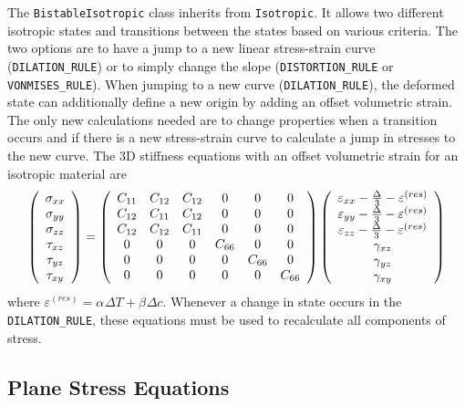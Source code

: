 \documentclass[11pt]{article}
\def\a#1{\alpha_{#1}}
\def\b#1{\beta_{#1}}
\def\code#1{{\small\tt #1}}
\def\DT{\Delta T}
\def\e#1{\varepsilon_{#1}}
\def\er#1{\varepsilon_{#1}^{(res)}}
\def\g#1{\gamma_{#1}}
\def\s#1{\sigma_{#1}}
\def\t#1{\tau_{#1}}
\begin{document}
The \code{BistableIsotropic} class inherits from \code{Isotropic}. It allows two different isotropic states and transitions  between the states based on various criteria. The two options are to have a jump to a new linear stress-strain curve (\code{DILATION\_RULE}) or to simply change the slope (\code{DISTORTION\_RULE} or \code{VONMISES\_RULE}). When jumping to a new curve (\code{DILATION\_RULE}), the deformed state can additionally define a new origin by adding an offset volumetric strain. The only new calculations needed are to change properties when a transition occurs and if there is a new stress-strain curve to calculate a jump in stresses to the new curve. The 3D stiffness equations with an offset volumetric strain for an isotropic material are
\begin{equation}
     \left(\begin{array}{c} \s{xx} \\ \s{yy} \\ \s{zz} \\ \t{xz} \\ \t{yz} \\ \t{xy} \end{array}\right)
       =  \left(\begin{array}{cccccc}
      C_{11} & C_{12} & C_{12} & 0 & 0 & 0 \\
      C_{12} & C_{11} & C_{12} & 0 & 0 & 0 \\
      C_{12} & C_{12} & C_{11} & 0 & 0 & 0 \\
      0 & 0 & 0 & C_{66} & 0 & 0 \\
      0 & 0 & 0 & 0 & C_{66} & 0  \\
      0 & 0 & 0 & 0 & 0 &  C_{66}  \end{array}\right)
     \left(\begin{array}{c} \e{xx} - {\Delta\over 3} -\er{}\\ \e{yy} - {\Delta\over 3} -\er{}\\ 
                   \e{zz} - {\Delta\over 3} - \er{}\\ 
                   \g{xz} \\ \g{yz} \\ \g{xy} \end{array}\right)
\end{equation}
where $\er{}=\a{}\DT+\b{}\Delta c$.
Whenever a change in state occurs in the \code{DILATION\_RULE}, these equations must be used to recalculate all components of stress.

\subsection{Plane Stress Equations}
\end{document}
